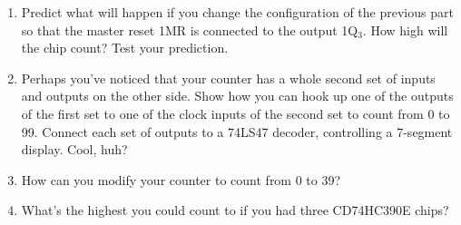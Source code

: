 \begin{enumerate}
\item Predict what will happen if you change the configuration of the previous part so that the master reset 1MR is connected to the output 1Q$_3$.  How high will the chip count?  Test your prediction.

\pagebreak[2]
\item Perhaps you've noticed that your counter has a whole second set of inputs and outputs on the other side.  Show how you can hook up one of the outputs of the first set to one of the clock inputs of the second set to count from 0 to 99.  Connect each set of outputs to a 74LS47 decoder, controlling a 7-segment display.  Cool, huh?

\item How can you modify your counter to count from 0 to 39?  

\item What's the highest you could count to if you had three CD74HC390E chips?


\end{enumerate}
